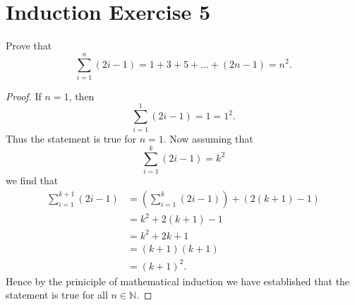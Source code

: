 \documentclass{article}
\begin{document}
\section*{Induction Exercise 5}
Prove that
\[
	\sum_{i=1}^{n} (2i-1) = 1 + 3 + 5 + ... + (2n-1) = n^2.
\]
\begin{proof}
	If $n=1$, then
	\[
		\sum_{i=1}^{1} (2i-1) = 1 = 1^2.
	\]
	Thus the statement is true for $n=1$.
	\newline\newline
	Now assuming that
	\[
		\sum_{i=1}^{k} (2i-1) = k^2
	\]
	we find that 
	\begin{align*}
		\sum_{i=1}^{k+1} (2i-1) & = \left( \sum_{i=1}^{k} (2i-1) \right) + \left(2(k+1)-1\right) \\
				        & = k^2 + 2(k+1) - 1 \\
				        & = k^2 + 2k + 1 \\
				        & = (k+1)(k+1) \\
				        & = (k+1)^2.
	\end{align*}
	Hence by the priniciple of mathematical induction we have established that the statement is true for all $n \in \mathbb{N}$.
\end{proof}
\end{document}
